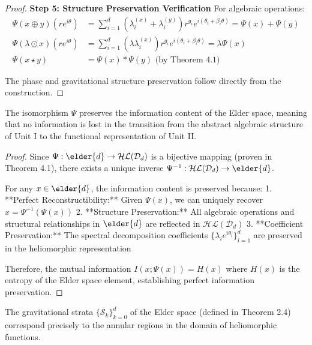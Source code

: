 \begin{proof}
\textbf{Step 5: Structure Preservation Verification}
For algebraic operations:
\begin{align}
\Psi(x \oplus y)(re^{i\theta}) &= \sum_{i=1}^{d} (\lambda_i^{(x)} + \lambda_i^{(y)}) r^{g_i} e^{i(\theta_i + \beta_i \theta)} = \Psi(x) + \Psi(y) \\
\Psi(\lambda \odot x)(re^{i\theta}) &= \sum_{i=1}^{d} (\lambda \lambda_i^{(x)}) r^{g_i} e^{i(\theta_i + \beta_i \theta)} = \lambda \Psi(x) \\
\Psi(x \star y) &= \Psi(x) * \Psi(y) \text{ (by Theorem 4.1)}
\end{align}

The phase and gravitational structure preservation follow directly from the construction.
\end{proof}

\begin{corollary}
\label{cor:information_preservation}
The isomorphism $\Psi$ preserves the information content of the Elder space, meaning that no information is lost in the transition from the abstract algebraic structure of Unit I to the functional representation of Unit II.
\end{corollary}

\begin{proof}
Since $\Psi: \elder{d} \rightarrow \mathcal{HL}(\mathcal{D}_d)$ is a bijective mapping (proven in Theorem 4.1), there exists a unique inverse $\Psi^{-1}: \mathcal{HL}(\mathcal{D}_d) \rightarrow \elder{d}$. 

For any $x \in \elder{d}$, the information content is preserved because:
1. **Perfect Reconstructibility:** Given $\Psi(x)$, we can uniquely recover $x = \Psi^{-1}(\Psi(x))$
2. **Structure Preservation:** All algebraic operations and structural relationships in $\elder{d}$ are reflected in $\mathcal{HL}(\mathcal{D}_d)$
3. **Coefficient Preservation:** The spectral decomposition coefficients $\{\lambda_i e^{i\theta_i}\}_{i=1}^d$ are preserved in the heliomorphic representation

Therefore, the mutual information $I(x; \Psi(x)) = H(x)$ where $H(x)$ is the entropy of the Elder space element, establishing perfect information preservation.
\end{proof}

\begin{theorem}
\label{thm:strata_correspondence}
The gravitational strata $\{\mathcal{S}_k\}_{k=0}^{d}$ of the Elder space (defined in Theorem 2.4) correspond precisely to the annular regions in the domain of heliomorphic functions.
\end{theorem}


